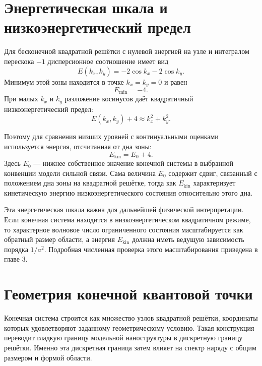 \section{Энергетическая шкала и низкоэнергетический предел}

Для бесконечной квадратной решётки с нулевой энергией на узле и интегралом перескока $-1$
дисперсионное соотношение имеет вид
\begin{equation}
  E(k_x,k_y)
  =
  -2\cos k_x
  -
  2\cos k_y .
\end{equation}
Минимум этой зоны находится в точке $k_x=k_y=0$ и равен
\begin{equation}
  E_{\min} = -4 .
\end{equation}
При малых $k_x$ и $k_y$ разложение косинусов даёт квадратичный низкоэнергетический предел:
\begin{equation}
  E(k_x,k_y) + 4
  \approx
  k_x^2 + k_y^2 .
\end{equation}

Поэтому для сравнения низших уровней с континуальными оценками используется энергия,
отсчитанная от дна зоны:
\begin{equation}
  E_{\mathrm{kin}} = E_0 + 4 .
\end{equation}
Здесь $E_0$ --- нижнее собственное значение конечной системы в выбранной конвенции модели
сильной связи. Сама величина $E_0$ содержит сдвиг, связанный с положением дна зоны на
квадратной решётке, тогда как $E_{\mathrm{kin}}$ характеризует кинетическую энергию
низкоэнергетического состояния относительно этого дна.

Эта энергетическая шкала важна для дальнейшей физической интерпретации. Если конечная
система находится в низкоэнергетическом квадратичном режиме, то характерное волновое число
ограниченного состояния масштабируется как обратный размер области, а энергия
$E_{\mathrm{kin}}$ должна иметь ведущую зависимость порядка $1/a^2$. Подробная численная
проверка этого масштабирования приведена в главе 3.

\section{Геометрия конечной квантовой точки}

Конечная система строится как множество узлов квадратной решётки, координаты которых
удовлетворяют заданному геометрическому условию. Такая конструкция переводит гладкую
границу модельной наноструктуры в дискретную границу решётки. Именно эта дискретная
граница затем влияет на спектр наряду с общим размером и формой области.


